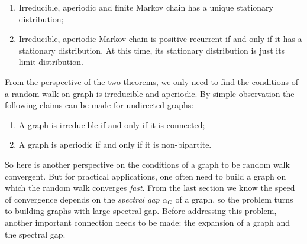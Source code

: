\begin{enumerate}
\item Irreducible, aperiodic and finite Markov chain has a unique
stationary distribution;
\item Irreducible, aperiodic Markov chain is positive recurrent if
and only if it has a stationary distribution. At this time, its
stationary distribution is just its limit distribution.
\end{enumerate}

From the perspective of the two theorems, we only need to find the
conditions of a random walk on graph is irreducible and aperiodic.
By simple observation the following claims can be made for
undirected graphs:

\begin{enumerate}
\item A graph is irreducible if and only if it is connected;
\item A graph is aperiodic if and only if it is non-bipartite.
\end{enumerate}

So here is another perspective on the conditions of a graph to be
random walk convergent. But for practical applications, one often
need to build a graph on which the random walk converges
\emph{fast}. From the last section we know the speed of convergence
depends on the \emph{spectral gap} $\alpha_G$ of a graph, so the
problem turns to building graphs with large spectral gap. Before
addressing this problem, another important connection needs to be
made: the expansion of a graph and the spectral gap.
